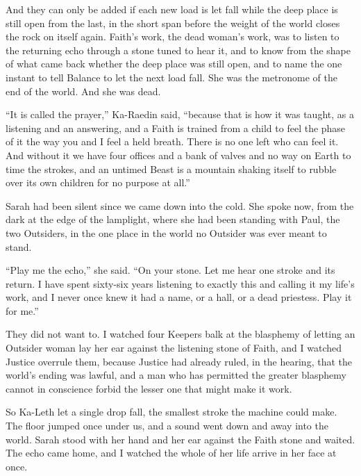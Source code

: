 And they can only be added if each new load is let fall while the deep place is still open from the last, in the short span before the weight of the world closes the rock on itself again. Faith's work, the dead woman's work, was to listen to the returning echo through a stone tuned to hear it, and to know from the shape of what came back whether the deep place was still open, and to name the one instant to tell Balance to let the next load fall. She was the metronome of the end of the world. And she was dead.\par

``It is called the prayer,'' Ka-Raedin said, ``because that is how it was taught, as a listening and an answering, and a Faith is trained from a child to feel the phase of it the way you and I feel a held breath. There is no one left who can feel it. And without it we have four offices and a bank of valves and no way on Earth to time the strokes, and an untimed Beast is a mountain shaking itself to rubble over its own children for no purpose at all.''\par

Sarah had been silent since we came down into the cold. She spoke now, from the dark at the edge of the lamplight, where she had been standing with Paul, the two Outsiders, in the one place in the world no Outsider was ever meant to stand.\par

``Play me the echo,'' she said. ``On your stone. Let me hear one stroke and its return. I have spent sixty-six years listening to exactly this and calling it my life's work, and I never once knew it had a name, or a hall, or a dead priestess. Play it for me.''\par

\ornament

They did not want to. I watched four Keepers balk at the blasphemy of letting an Outsider woman lay her ear against the listening stone of Faith, and I watched Justice overrule them, because Justice had already ruled, in the hearing, that the world's ending was lawful, and a man who has permitted the greater blasphemy cannot in conscience forbid the lesser one that might make it work.\par

So Ka-Leth let a single drop fall, the smallest stroke the machine could make. The floor jumped once under us, and a sound went down and away into the world. Sarah stood with her hand and her ear against the Faith stone and waited. The echo came home, and I watched the whole of her life arrive in her face at once.\par

